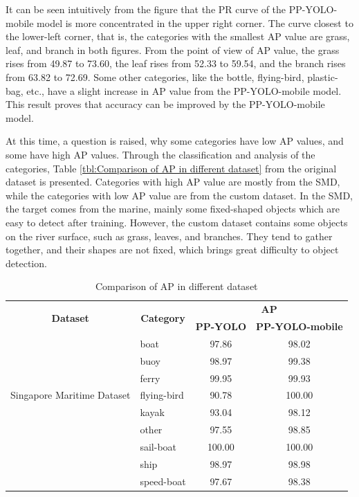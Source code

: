\documentclass[sensors,article,submit,moreauthors,pdftex]{Definitions/mdpi}
\begin{document}
\begin{paracol}{2}
It can be seen intuitively from the figure that the PR curve of the PP-YOLO-mobile model is more concentrated in the upper right corner. 
The curve closest to the lower-left corner, that is, the categories with the smallest AP value are grass, leaf, and branch in both figures.
From the point of view of AP value, the grass rises from 49.87 to 73.60, the leaf rises from 52.33 to 59.54, and the branch rises from 63.82 to 72.69. Some other categories, like the bottle, flying-bird, plastic-bag, etc., have a slight increase in AP value from the PP-YOLO-mobile model. This result proves that accuracy can be improved by the PP-YOLO-mobile model.


At this time, a question is raised, why some categories have low AP values, and some have high AP values. Through the classification and analysis of the categories, Table \ref{tbl:Comparison of AP in different dataset} from the original dataset is presented. Categories with high AP value are mostly from the SMD, while the categories with low AP value are from the custom dataset. In the SMD, the target comes from the marine, mainly some fixed-shaped objects which are easy to detect after training. However, the custom dataset contains some objects on the river surface, such as grass, leaves, and branches. They tend to gather together, and their shapes are not fixed, which brings great difficulty to object detection.

\begin{table}[htbp]
\centering
\caption{Comparison of AP in different dataset}
\begin{tabular}{llcc} 
\toprule

\multicolumn{1}{c}{\multirow{2}{*}{\textbf{Dataset}}} &
\multicolumn{1}{c}{\multirow{2}{*}{\textbf{Category}}} &\multicolumn{2}{c}{\textbf{AP}} \\
\cmidrule(l){3-4} 
&& \textbf{PP-YOLO} & \textbf{PP-YOLO-mobile} \\

\midrule
\multirow{7}{*}{Singapore Maritime Dataset} 
& boat& 97.86  & 98.02  \\
& buoy & 98.97 & 99.38 \\
& ferry & 99.95 & 99.93 \\
& flying-bird & 90.78 & 100.00 \\
& kayak & 93.04 & 98.12 \\
& other & 97.55 & 98.85 \\
& sail-boat & 100.00 & 100.00 \\
& ship & 98.97 & 98.98 \\
& speed-boat & 97.67 & 98.38 \\
\cmidrule(r){1-4}


\end{tabular}
\end{table}
\end{paracol}
\end{document}
